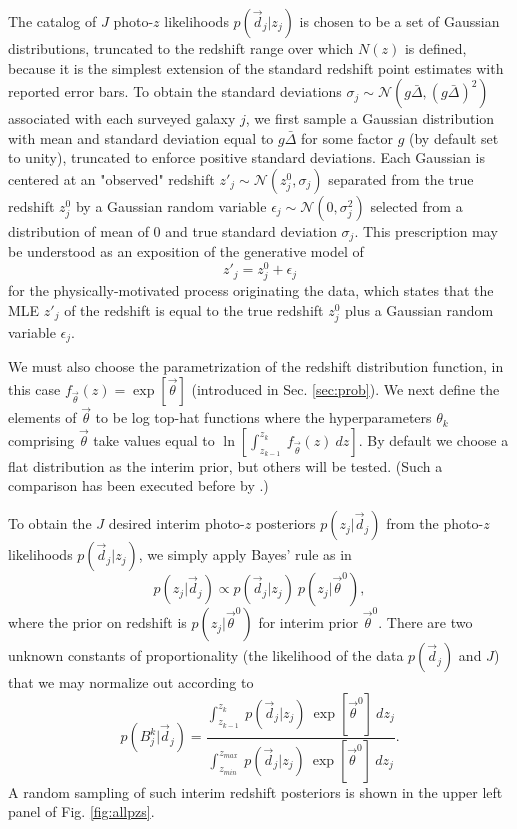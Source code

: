 \documentclass[preprint]{aastex}
\begin{document}
The catalog of $J$ photo-$z$ likelihoods $p(\vec{d}_{j}|z_{j})$ is chosen to be 
a set of Gaussian distributions, truncated to the redshift range over which 
$N(z)$ is defined, because it is the simplest extension of the standard 
redshift point estimates with reported error bars.  To obtain the standard 
deviations $\sigma_{j}\sim\mathcal{N}(g\bar{\Delta},(g\bar{\Delta})^{2})$ 
associated with each surveyed galaxy $j$, we first sample a Gaussian 
distribution with mean and standard deviation equal to $g\bar{\Delta}$ for some 
factor $g$ (by default set to unity), truncated to enforce positive standard 
deviations.  Each Gaussian is centered at an "observed" redshift 
$z'_{j}\sim\mathcal{N}(z^{0}_{j},\sigma_{j})$ separated from the true redshift 
$z^{0}_{j}$ by a Gaussian random variable 
$\epsilon_{j}\sim\mathcal{N}(0,\sigma^{2}_{j})$ selected from a distribution of 
mean of 0 and true standard deviation $\sigma_{j}$.   This prescription may be 
understood as an exposition of the generative model of 
\begin{equation}\label{eq:genmod} z'_{j} = z^{0}_{j}+\epsilon_{j}\end{equation} 
for the physically-motivated process originating the data, which states that 
the MLE $z'_{j}$ of the redshift is equal to the true redshift $z^{0}_{j}$ plus 
a Gaussian random variable $\epsilon_{j}$.

We must also choose the parametrization of the redshift distribution function, 
in this case $f_{\vec{\theta}}(z)=\exp[\vec{\theta}]$ (introduced in Sec. 
\ref{sec:prob}).  We next define the elements of $\vec{\theta}$ to be log 
top-hat functions where the hyperparameters $\theta_{k}$ comprising 
$\vec{\theta}$ take values equal to $\ln[\int_{z_{k-1}}^{z_{k}}\ 
f_{\vec{\theta}}(z)\ dz]$.  By default we choose a flat distribution as the 
interim prior, but others will be tested.  (Such a comparison has been executed 
before by \citet{Viironen2015}.)

To obtain the $J$ desired interim photo-$z$ posteriors $p(z_{j}|\vec{d}_{j})$ 
from the photo-$z$ likelihoods $p(\vec{d}_{j}|z_{j})$, we simply apply Bayes' 
rule as in \begin{equation}\label{eq:likpost} p(z_{j}|\vec{d}_{j}) \propto 
p(\vec{d}_{j}|z_{j})\ p(z_{j}|\vec{\theta}^{0}),\end{equation} where the prior 
on redshift is $p(z_{j}|\vec{\theta}^{0})$ for interim prior 
$\vec{\theta}^{0}$.  There are two unknown constants of proportionality (the 
likelihood of the data $p(\vec{d}_{j})$ and $J$) that we may normalize out 
according to \begin{equation}\label{eq:norm} p(B^{k}_{j}|\vec{d}_{j}) = 
\frac{\int_{z_{k-1}}^{z_{k}}\ p(\vec{d}_{j}|z_{j})\ \exp[\vec{\theta}^{0}]\ 
dz_{j}}{\int_{z_{min}}^{z_{max}}\ p(\vec{d}_{j}|z_{j})\ \exp[\vec{\theta}^{0}]\ 
dz_{j}}.\end{equation}  A random sampling of such interim redshift posteriors 
is shown in the upper left panel of Fig. \ref{fig:allpzs}.
\end{document}
